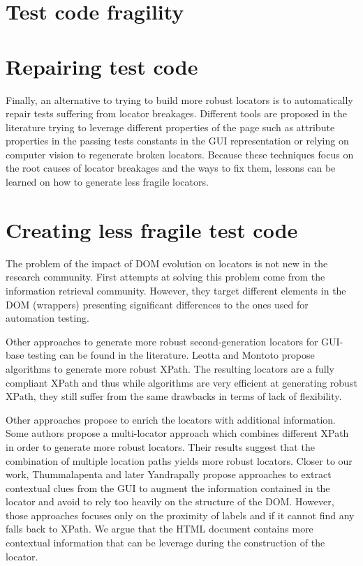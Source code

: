 
\section{Test code fragility}

\section{Repairing test code}

Finally, an alternative to trying to build more robust locators is to automatically repair tests suffering from locator breakages. Different tools are proposed in the literature trying to leverage different properties of the page such as attribute properties in the passing tests\cite{Choudhary2011} constants in the GUI representation\cite{Kirinuki2019} or relying on computer vision\cite{Stocco2018} to regenerate broken locators. Because these techniques focus on the root causes of locator breakages and the ways to fix them, lessons can be learned on how to generate less fragile locators.

\section{Creating less fragile test code}

The problem of the impact of DOM evolution on locators is not new in the research community. First attempts at solving this problem come from the information retrieval community\cite{Anton2005, Dalvi2009, Cohen2015}. However, they target different elements in the DOM (wrappers) presenting significant differences to the ones used for automation testing.

Other approaches to generate more robust second-generation locators for GUI-base testing can be found in the literature. Leotta\etal\cite{Leotta2014, Leotta2016} and Montoto\etal\cite{Montoto2011} propose algorithms to generate more robust XPath. The resulting locators are a fully compliant XPath and thus while algorithms are very efficient at generating robust XPath, they still suffer from the same drawbacks in terms of lack of flexibility. 

Other approaches propose to enrich the locators with additional information. Some authors\cite{Leotta2015, Zheng2018} propose a multi-locator approach which combines different XPath in order to generate more robust locators. Their results suggest that the combination of multiple location paths yields more robust locators. Closer to our work, Thummalapenta\etal\cite{Thummalapenta2013} and later Yandrapally\etal\cite{Yandrapally2014} propose approaches to extract contextual clues from the GUI to augment the information contained in the locator and avoid to rely too heavily on the structure of the DOM. However, those approaches focuses only on the proximity of labels and if it cannot find any falls back to XPath. We argue that the HTML document contains more contextual information that can be leverage during the construction of the locator.